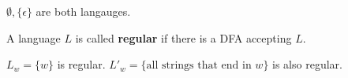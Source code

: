 \documentclass[11pt,a4paper]{article}
\begin{document}
\begin{example}
    $\emptyset,\{\epsilon\}$ are both langauges.
\end{example}

\begin{definition}
    A language $L$ is called \textbf{regular} if there is a DFA accepting $L$.
\end{definition}

\begin{example}
    $L_w=\{w\}$ is regular. $L'_w=\{\text{all strings that end in }w\}$ is also regular.
\end{example}
\end{document}
